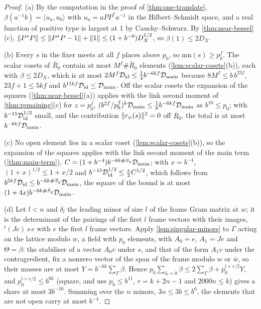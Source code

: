 \begin{proof}
(a) By the computation in the proof of \cref{thm:one-translate}, $\beta(a^{-1}b)=\langle u_a,u_b\rangle$ with $u_a=aPP^*a^{-1}$ in the Hilbert--Schmidt space, and a real function of positive type is largest at $1$ by Cauchy--Schwarz. By \cref{thm:near-bessel}(c),
$\lVert P^*P\rVert\le\lVert P^*P-1\rVert+\lVert 1\rVert\le(1+b^{-6})D_X^{1/2}$, so $\beta(1)\le2D_X$.

(b) Every $s$ in the fixer meets at all $f$ places above $p_0$, so $\mathrm{mn}(s)\ge p_0^f$. The scalar cosets of $\bar R_0$ contain at most $M^f\#\bar R_0$ elements (\cref{lem:scalar-cosets}(b)), each with $\beta\le2D_X$, which is at most $2M^f\mathcal D_{\rm id}\le\frac14b^{-6kf}\mathcal D_{\rm main}$
because $8M^f\le b\,b^{23f}$, $23f+1\le5kf$ and $b^{11kf}\mathcal D_{\rm id}\le\mathcal D_{\rm main}$. Off the scalar cosets the expansion of the squares (\cref{thm:near-bessel}(a)) applies with the link second moment of \cref{thm:remaining}(c) for $z=p_0^f$,
$(b^{2f}/p_0^f)^k\mathcal D_{\rm main}\le\frac18b^{-6kf}\mathcal D_{\rm main}$ as $b^{10}\le p_0$; with $b^{-15}\mathcal D_{\rm id}^{1/2}$ small, and the contribution $\lVert r_\psi(s)\rVert^2=0$ off $\bar R_0$, the total is at most $b^{-6kf}\mathcal D_{\rm main}$.

(c) No open element lies in a scalar coset (\cref{lem:scalar-cosets}(b)), so the expansion of the squares applies with the link second moment of the main term (\cref{thm:main-term}), $C=(1+b^{-4})b^{-6k\#S_g}\mathcal D_{\rm main}$; with $x=b^{-4}$, $(1+x)^{1/2}\le1+x/2$ and
$b^{-15}\mathcal D_{\rm id}^{1/2}\le\frac x2C^{1/2}$, which follows from $b^{5kf}\mathcal D_{\rm id}\le b^{-6k\#S_g}\mathcal D_{\rm main}$, the square of the bound is at most $(1+4x)b^{-6k\#S_g}\mathcal D_{\rm main}$.

(d) Let $l<n$ and $\delta_l$ the leading minor of size $l$ of the frame Gram matrix at $w$; it is the determinant of the pairings of the first $l$ frame vectors with their images, ${}^t(Je)\,s\,e$ with $e$ the first $l$ frame vectors. Apply \cref{lem:singular-minors} to $\Gamma$ acting on the lattice
modulo $w$, a field with $p_0$ elements, with $A_0=e$, $A_1=Je$ and $\Theta=\beta$: the stabiliser of a vector $A_0v$ under $s$, and that of the form $A_1v$ under the contragredient, fix a nonzero vector of the span of the frame modulo $w$ or $\bar w$, so their masses are at most
$Y=b^{-6k}\sum_\Gamma\beta$. Hence $p_0\sum_{\delta_l=0}\beta\le2\sum_\Gamma\beta+p_0^{l+r/2}Y$, and $p_0^{l+r/2}\le b^{6k}$ (square, and use $p_0\le b^{11}$, $r=k+2n-1$ and $2000n\le k$) gives a share at most $3b^{-10}$. Summing over the $n$ minors, $3n\le3b\le b^6$, the elements that are not
open carry at most $b^{-4}$.
\end{proof}

